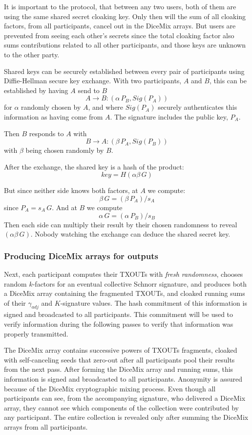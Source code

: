 \documentclass[a4paper, 10pt, conference]{ieeeconf}
\begin{document}
It is important to the protocol, that between any two users, both of them are using the same shared secret cloaking key. Only then will the sum of all cloaking factors, from all participants, cancel out in the DiceMix arrays. But users are prevented from seeing each other's secrets since the total cloaking factor also sums contributions related to all other participants, and those keys are unknown to the other party.

Shared keys can be securely established between every pair of participants using Diffie-Hellman secure key exchange\cite{c21}. With two participants, $A$ and $B$, this can be established by having $A$ send to $B$
$$A \rightarrow B: (\alpha \, P_B, Sig(P_A))$$
for $\alpha$ randomly chosen by $A$, and where $Sig(P_A)$ securely authenticates this information as having come from $A$. The signature includes the public key, $P_A$. 

Then $B$ responds to $A$ with
$$B \rightarrow A: (\beta \, P_A, Sig(P_B))$$
with $\beta$ being chosen randomly by $B$. 

After the exchange, the shared key is a hash of the product:
$$key = H(\alpha \beta \, G)$$ 

But since neither side knows both factors, at $A$ we compute:
$$\beta \, G = (\beta \, P_A) / s_A$$
since $P_A = s_A \, G$. And at $B$ we compute
$$\alpha \, G = (\alpha \, P_B) / s_B$$
Then each side can multiply their result by their chosen randomness to reveal $(\alpha \beta \, G)$. Nobody watching the exchange can deduce the shared secret key.

\subsubsection{Producing DiceMix arrays for outputs} Next, each participant computes their TXOUTs with \textit{fresh randomness}, chooses random $k$-factors for an eventual collective Schnorr signature, and produces both a DiceMix array containing the fragmented TXOUTs, and cloaked running sums of their $\gamma_{adj}$ and $K$-signature values. The hash commitment of this information is signed and broadcasted to all participants. This commitment will be used to verify information during the following passes to verify that information was properly transmitted.

The DiceMix array contains successive powers of TXOUTs fragments, cloaked with self-canceling seeds that zero-out after all participants pool their results from the next pass. After forming the DiceMix array and running sums, this information is signed and broadcasted to all participants. Anonymity is assured because of the DiceMix cryptographic mixing process. Even though all participants can see, from the accompanying signature, who delivered a DiceMix array, they cannot see which components of the collection were contributed by any participant. The entire collection is revealed only after summing the DiceMix arrays from all participants.
\end{document}
